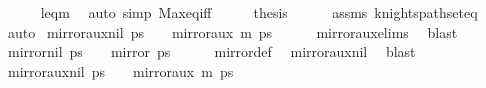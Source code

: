 \begin{isabellebody}
\ \ \ \ \isamarkupfalse%
\ leq{\isacharunderscore}{\kern0pt}m\ \isamarkupfalse%
\ {\isacharparenleft}{\kern0pt}auto\ simp{\isacharcolon}{\kern0pt}\ Max{\isacharunderscore}{\kern0pt}eq{\isacharunderscore}{\kern0pt}iff{\isacharparenright}{\kern0pt}\isanewline
\ \ \isamarkupfalse%
\ \isamarkupfalse%
\ {\isacharquery}{\kern0pt}thesis\isanewline
\ \ \ \ \isamarkupfalse%
\ assms\ knights{\isacharunderscore}{\kern0pt}path{\isacharunderscore}{\kern0pt}set{\isacharunderscore}{\kern0pt}eq\ \isamarkupfalse%
\ auto\isanewline
{}\isamarkupfalse%
%
\endisatagproof
{\isafoldproof}%
%
\isadelimproof
\isanewline
%
\endisadelimproof
\isanewline
{}\isamarkupfalse%
\ mirror{}{\isacharunderscore}{\kern0pt}aux{\isacharunderscore}{\kern0pt}nil{\isacharcolon}{\kern0pt}\ {\isachardoublequoteopen}ps\ {\isacharequal}{\kern0pt}\ {\isacharbrackleft}{\kern0pt}{\isacharbrackright}{\kern0pt}\ {\isasymlongleftrightarrow}\ mirror{}{\isacharunderscore}{\kern0pt}aux\ m\ ps\ {\isacharequal}{\kern0pt}\ {\isacharbrackleft}{\kern0pt}{\isacharbrackright}{\kern0pt}{\isachardoublequoteclose}\isanewline
%
\isadelimproof
\ \ %
\endisadelimproof
%
\isatagproof
{}\isamarkupfalse%
\ mirror{}{\isacharunderscore}{\kern0pt}aux{\isachardot}{\kern0pt}elims\ \isamarkupfalse%
\ blast%
\endisatagproof
{\isafoldproof}%
%
\isadelimproof
\isanewline
%
\endisadelimproof
\isanewline
{}\isamarkupfalse%
\ mirror{}{\isacharunderscore}{\kern0pt}nil{\isacharcolon}{\kern0pt}\ {\isachardoublequoteopen}ps\ {\isacharequal}{\kern0pt}\ {\isacharbrackleft}{\kern0pt}{\isacharbrackright}{\kern0pt}\ {\isasymlongleftrightarrow}\ mirror{}\ ps\ {\isacharequal}{\kern0pt}\ {\isacharbrackleft}{\kern0pt}{\isacharbrackright}{\kern0pt}{\isachardoublequoteclose}\isanewline
%
\isadelimproof
\ \ %
\endisadelimproof
%
\isatagproof
{}\isamarkupfalse%
\ mirror{}{\isacharunderscore}{\kern0pt}def\ \isamarkupfalse%
\ mirror{}{\isacharunderscore}{\kern0pt}aux{\isacharunderscore}{\kern0pt}nil\ \isamarkupfalse%
\ blast%
\endisatagproof
{\isafoldproof}%
%
\isadelimproof
\isanewline
%
\endisadelimproof
\isanewline
{}\isamarkupfalse%
\ mirror{}{\isacharunderscore}{\kern0pt}aux{\isacharunderscore}{\kern0pt}nil{\isacharcolon}{\kern0pt}\ {\isachardoublequoteopen}ps\ {\isacharequal}{\kern0pt}\ {\isacharbrackleft}{\kern0pt}{\isacharbrackright}{\kern0pt}\ {\isasymlongleftrightarrow}\ mirror{}{\isacharunderscore}{\kern0pt}aux\ m\ ps\ {\isacharequal}{\kern0pt}\ {\isacharbrackleft}{\kern0pt}{\isacharbrackright}{\kern0pt}{\isachardoublequoteclose}\isanewline

\end{isabellebody}
